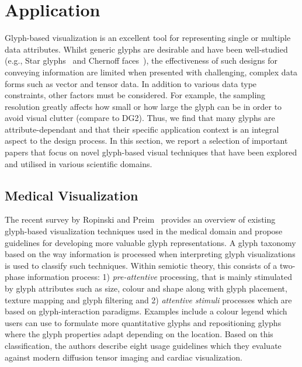 \section{Application}\label{sec:Application}
Glyph-based visualization is an excellent tool for representing single or multiple data attributes.
Whilst generic glyphs are desirable and have been well-studied (e.g., Star glyphs~\cite{siegel72} and Chernoff faces~\cite{Chernoff73faces}), the effectiveness of such designs for conveying information are limited when presented with challenging, complex data forms such as vector and tensor data.
In addition to various data type constraints, other factors must be considered.
For example, the sampling resolution greatly affects how small or how large the glyph can be in order to avoid visual clutter (compare to DG2).
Thus, we find that many glyphs are attribute-dependant and that their specific application context is an integral aspect to the design process. 
In this section, we report a selection of important papers that focus on novel glyph-based visual techniques that have been explored and utilised in various scientific domains.

\subsection{Medical Visualization}

The recent survey by Ropinski and Preim~\cite{ropinskiPreim08glyphTaxonomy,Ropinski11glyphs} provides an overview of existing glyph-based visualization techniques used in the medical domain and propose guidelines for developing more valuable glyph representations. 
A glyph taxonomy based on the way information is processed when interpreting glyph visualizations is used to classify such techniques.
Within semiotic theory, this consists of a two-phase information process:
1) \textit{pre-attentive} processing, that is mainly stimulated by glyph attributes such as size, colour and shape along with glyph placement, texture mapping and glyph filtering and 2) \textit{attentive stimuli} processes which are based on glyph-interaction paradigms. Examples include a colour legend which users can use to formulate more quantitative glyphs and repositioning glyphs where the glyph properties adapt depending on the location. Based on this classification, the authors describe eight usage guidelines which they evaluate against modern diffusion tensor imaging and cardiac visualization. 

